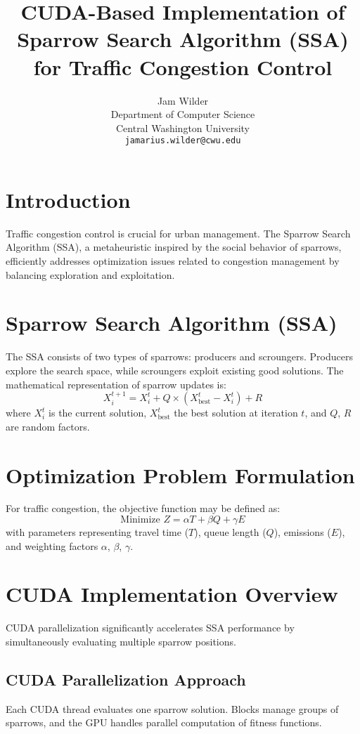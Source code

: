 \documentclass{article}
\title{CUDA-Based Implementation of Sparrow Search Algorithm (SSA) for Traffic Congestion Control}
\author{Jam Wilder \\
Department of Computer Science \\
Central Washington University \\
\texttt{jamarius.wilder@cwu.edu}}
\begin{document}
\maketitle

\section{Introduction}
Traffic congestion control is crucial for urban management. The Sparrow Search Algorithm (SSA), a metaheuristic inspired by the social behavior of sparrows, efficiently addresses optimization issues related to congestion management by balancing exploration and exploitation.

\section{Sparrow Search Algorithm (SSA)}
The SSA consists of two types of sparrows: producers and scroungers. Producers explore the search space, while scroungers exploit existing good solutions. The mathematical representation of sparrow updates is:
\begin{equation}
X_i^{t+1} = X_i^t + Q \times (X_{\text{best}}^t - X_i^t) + R
\end{equation}
where $X_i^t$ is the current solution, $X_{\text{best}}^t$ the best solution at iteration $t$, and $Q$, $R$ are random factors.

\section{Optimization Problem Formulation}
For traffic congestion, the objective function may be defined as:
\begin{equation}
\text{Minimize } Z = \alpha T + \beta Q + \gamma E
\end{equation}
with parameters representing travel time ($T$), queue length ($Q$), emissions ($E$), and weighting factors $\alpha$, $\beta$, $\gamma$.

\section{CUDA Implementation Overview}
CUDA parallelization significantly accelerates SSA performance by simultaneously evaluating multiple sparrow positions.

\subsection{CUDA Parallelization Approach}
Each CUDA thread evaluates one sparrow solution. Blocks manage groups of sparrows, and the GPU handles parallel computation of fitness functions.
\end{document}
